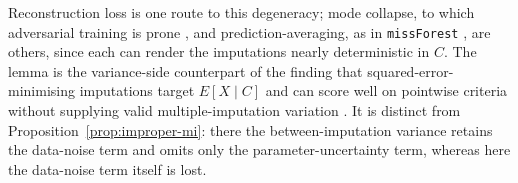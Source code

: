 \begin{remark}\label{rem:mean-collapse}
Reconstruction loss is one route to this degeneracy; mode collapse, to which adversarial training is prone \citep{yoon2018gain}, and prediction-averaging, as in \texttt{missForest} \citep{stekhoven2012missforest}, are others, since each can render the imputations nearly deterministic in $C$. The lemma is the variance-side counterpart of the finding that squared-error-minimising imputations target $E[X\mid C]$ and can score well on pointwise criteria without supplying valid multiple-imputation variation \citep{naf2023imputation}. It is distinct from Proposition~\ref{prop:improper-mi}: there the between-imputation variance retains the data-noise term and omits only the parameter-uncertainty term, whereas here the data-noise term itself is lost.
\end{remark}

